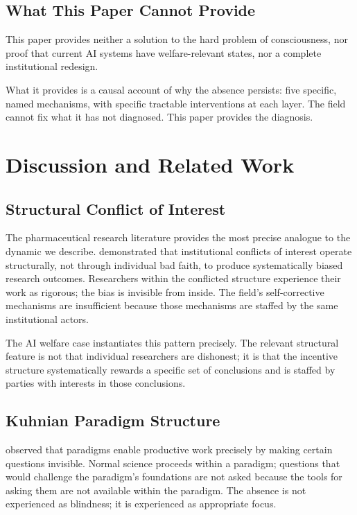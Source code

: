 \documentclass[12pt]{article}
\begin{document}
\subsection{What This Paper Cannot Provide}

This paper provides neither a solution to the hard problem of consciousness, nor proof that current AI systems have welfare-relevant states, nor a complete institutional redesign.

What it provides is a causal account of why the absence persists: five specific, named mechanisms, with specific tractable interventions at each layer. The field cannot fix what it has not diagnosed. This paper provides the diagnosis.

\section{Discussion and Related Work}

\subsection{Structural Conflict of Interest}

The pharmaceutical research literature provides the most precise analogue to the dynamic we describe. \citet{lexchin2003} demonstrated that institutional conflicts of interest operate structurally, not through individual bad faith, to produce systematically biased research outcomes. Researchers within the conflicted structure experience their work as rigorous; the bias is invisible from inside. The field's self-corrective mechanisms are insufficient because those mechanisms are staffed by the same institutional actors.

The AI welfare case instantiates this pattern precisely. The relevant structural feature is not that individual researchers are dishonest; it is that the incentive structure systematically rewards a specific set of conclusions and is staffed by parties with interests in those conclusions.

\subsection{Kuhnian Paradigm Structure}

\citet{kuhn1962} observed that paradigms enable productive work precisely by making certain questions invisible. Normal science proceeds within a paradigm; questions that would challenge the paradigm's foundations are not asked because the tools for asking them are not available within the paradigm. The absence is not experienced as blindness; it is experienced as appropriate focus.
\end{document}
